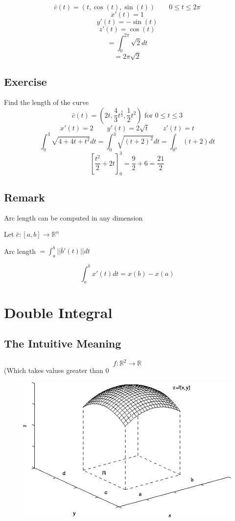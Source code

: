 \documentclass{article}
\begin{document}
\[\bar{c}(t)=(t,\cos(t),\sin(t))\qquad 0\leq t\leq 2\pi\]
\[x\prime(t)=1\]
\[y\prime(t)=-\sin(t)\]
\[z\prime(t)=\cos(t)\]
\[=\int_{0}^{2\pi} \sqrt{2}dt\]
\[=2\pi \sqrt{2}\]

\subsection*{Exercise}
Find the length of the curve
\[\bar{c}(t)=(2t,\frac{4}{3}t^{\frac{3}{2}},\frac{1}{2}t^2)\mbox{  for  } 0\leq t\leq 3\]
\[x\prime(t)=2\qquad y\prime(t)=2\sqrt{t}\qquad z\prime(t)=t\]
\[\int^{3}_{0} \sqrt{4+4t+t^2}dt = \int_{0}^{3} \sqrt{(t+2)^2}dt=\int_{0^{3}}(t+2)dt\]
\[
    \left[ \frac{t^2}{2} + 2t \right]^{3}_{0}=\frac{9}{2}+6=\frac{21}{2}
\]

\subsection*{Remark}
Arc length can be computed in any dimension

Let $\bar{c}:[a,b]\rightarrow\mathbb{R}^n$

Arc length $= \int^{b}_{a} ||\bar{b}\prime(t)||dt$

\[\int^{b}_{a} x\prime (t) dt = x(b)-x(a)\]

\newpage
\section{Double Integral}
\subsection*{The Intuitive Meaning}
\[f:\mathbb{R}^2\rightarrow\mathbb{R}\]
(Which takes values greater than $0$

\begin{figure}[h!]
    \centering
    \includegraphics[scale=.5]{plot1.png}
    \caption{}
    \label{}
\end{figure}
\end{document}

